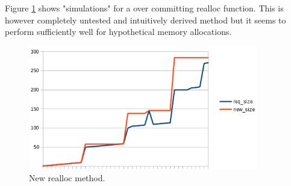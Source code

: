 Figure \ref{figure:realloc} shows "simulations" for a over committing realloc
function. This is however completely untested and intuitively derived method
but it seems to perform sufficiently well for hypothetical memory allocations.

\begin{figure}
  \center
  \includegraphics[width=10cm]{pics/realloc}
  \caption{New realloc method.}
  \label{figure:realloc}
\end{figure}
